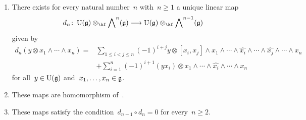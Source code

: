 \begin{proposition}
	\label{construction of koszul differential}
	\leavevmode
	\begin{enumerate}
		\item
			There exists for every natural number~$n$ with~$n \geq 1$ a unique linear map
			\[
				d_n
				\colon
				\Univ(\glie) \otimes_{\kf} \Exterior^n(\glie)
				\to
				\Univ(\glie) \otimes_{\kf} \Exterior^{n-1}(\glie)
			\]
			given by
			\begin{align*}
				d_n( y \otimes x_1 \wedge \dotsb \wedge x_n )   
				={}&
				\sum_{1 \leq i < j \leq n}
				(-1)^{i+j}
				y \otimes [x_i, x_j] \wedge x_1 \wedge \dotsb \wedge \widehat{x_i} \wedge \dotsb \wedge \widehat{x_j} \wedge \dotsb \wedge x_n
				\\
				{}&
				+
				\sum_{i=1}^n
				(-1)^{i+1}
				(y x_i) \otimes x_1 \wedge \dotsb \wedge \widehat{ x_i } \wedge \dotsb \wedge x_n
			\end{align*}
			for all~$y \in \operatorname{U}(\mathfrak{g})$ and~$x_1, \dotsc, x_n \in \mathfrak{g}$.
		\item
			These maps are homomorphism of~\modules{$\Univ(\glie)$}.
		\item
			These maps satisfy the condition~$d_{n-1} \circ d_n = 0$ for every~$n \geq 2$.
	\end{enumerate}
\end{proposition}



